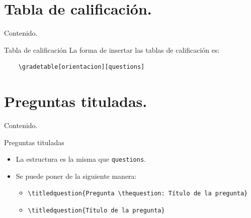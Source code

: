 \documentclass[dvipsnames,xcolor=x11names, handout]{beamer}
\theoremstyle{plain}
\theoremstyle{definition}
\begin{document}
\section{Tabla de calificación.}
\begin{frame}{Contenido.}
  \tableofcontents[currentsection]
\end{frame}

\begin{frame}[fragile]{Tabla de calificación}
La forma de insertar las tablas de calificación es:
\begin{verbatim}
    \gradetable[orientacion][questions]
\end{verbatim}
\end{frame}

\section{Preguntas tituladas.}
\begin{frame}{Contenido.}
  \tableofcontents[currentsection]
\end{frame}

\begin{frame}[fragile]{Preguntas tituladas}
\begin{itemize}[<+->]
    \item La estructura es la misma que \verb!questions!. 
    \item Se puede poner de la siguiente manera:
    \begin{itemize}[<+->]
        \item \verb!\titledquestion{Pregunta \thequestion: Título de la pregunta}!
        \item \verb!\titledquestion{Título de la pregunta}!
    \end{itemize}
\end{itemize}
    
\end{frame}
\end{document}
